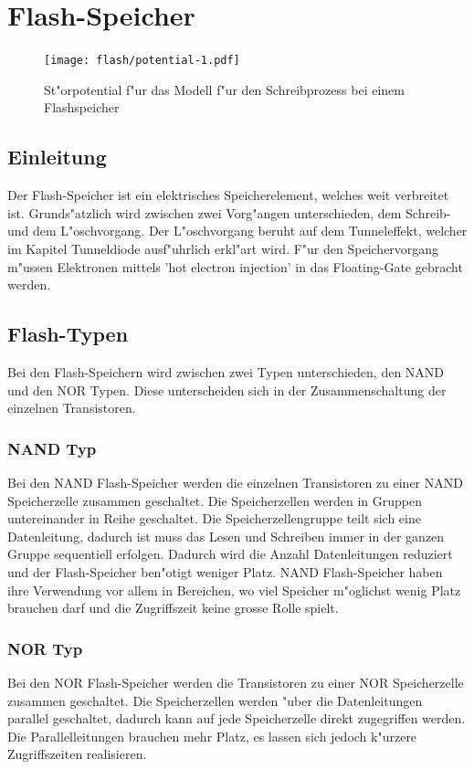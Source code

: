 \chapter{Flash-Speicher\label{chapter:flash}}
\begin{refsection}

\begin{figure}
\centering
\texttt{[image: flash/potential-1.pdf]}
\caption{St"orpotential f"ur das Modell f"ur den Schreibprozess bei
einem Flashspeicher}
\end{figure}

\section{Einleitung}
Der Flash-Speicher ist ein elektrisches Speicherelement, welches weit verbreitet ist. Grunds"atzlich wird zwischen zwei Vorg"angen unterschieden, dem Schreib- und dem L"oschvorgang. Der L"oschvorgang beruht auf dem Tunneleffekt, welcher im Kapitel Tunneldiode ausf"uhrlich erkl"art wird. F"ur den Speichervorgang m"ussen Elektronen mittels 'hot electron injection' in das Floating-Gate gebracht werden. 

\section{Flash-Typen}
Bei den Flash-Speichern wird zwischen zwei Typen unterschieden, den NAND und den NOR Typen. Diese unterscheiden sich in der Zusammenschaltung der einzelnen Transistoren. 

\subsection{NAND Typ}
Bei den NAND Flash-Speicher werden die einzelnen Transistoren zu einer NAND Speicherzelle zusammen geschaltet. 
Die Speicherzellen werden in Gruppen untereinander in Reihe geschaltet. Die Speicherzellengruppe teilt sich eine Datenleitung, dadurch ist muss das Lesen und Schreiben immer in der ganzen Gruppe sequentiell erfolgen. Dadurch wird die Anzahl Datenleitungen reduziert und der Flash-Speicher ben"otigt weniger Platz. NAND Flash-Speicher haben ihre Verwendung vor allem in Bereichen, wo viel Speicher m"oglichst wenig Platz brauchen darf und die Zugriffszeit keine grosse Rolle spielt.
\subsection{NOR Typ}
Bei den NOR Flash-Speicher werden die Transistoren zu einer NOR Speicherzelle zusammen geschaltet.
Die Speicherzellen werden "uber die Datenleitungen parallel geschaltet, dadurch kann auf jede Speicherzelle direkt zugegriffen werden. Die Parallelleitungen brauchen mehr Platz, es lassen sich jedoch k"urzere Zugriffszeiten realisieren.


\end{refsection}
